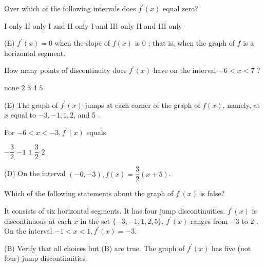 \newpage




\question\label{calc03:graphfp-first}
Over which of the following intervals does $f^{\prime}(x)$ equal zero?
\begin{choices}
  \choice I only
  \choice II only
  \choice I and II only
  \choice I and III only
  \CorrectChoice II and III only
\end{choices}
\begin{solution}
(E) $f^{\prime}(x)=0$ when the slope of $f(x)$ is 0 ; that is, when the graph of $f$ is a horizontal segment.
\end{solution}

\question
How many points of discontinuity does $f^{\prime}(x)$ have on the interval $-6<x<7$ ?
\begin{choices}
  \choice none
  \choice $2$
  \choice $3$
  \choice $4$
  \CorrectChoice $5$
\end{choices}
\begin{solution}
(E) The graph of $f^{\prime}(x)$ jumps at each corner of the graph of $f(x)$, namely, at $x$ equal to $-3,-1,1,2$, and 5 .
\end{solution}

\question
For $-6<x<-3, f^{\prime}(x)$ equals
\begin{choices}
  \choice $-\dfrac{3}{2}$
  \choice $-1$
  \choice $1$
  \CorrectChoice $\dfrac{3}{2}$
  \choice $2$
\end{choices}
\begin{solution}
(D) On the interval $(-6,-3), f(x)=\dfrac{3}{2}(x+5)$.
\end{solution}




\newpage




\question\label{calc03:graphfp-last}\label{calc03:graphf-last}
Which of the following statements about the graph of $f^{\prime}(x)$ is false?
\begin{choices}
  \choice It consists of six horizontal segments.
  \CorrectChoice It has four jump discontinuities.
  \choice $f^{\prime}(x)$ is discontinuous at each $x$ in the set $\{-3,-1,1,2,5\}$.
  \choice $f^{\prime}(x)$ ranges from $-3$ to $2$ .
  \choice On the interval $-1<x<1, f^{\prime}(x)=-3$.
\end{choices}
\begin{solution}
(B) Verify that all choices but (B) are true. The graph of $f^{\prime}(x)$ has five (not four) jump discontinuities.
\end{solution}

